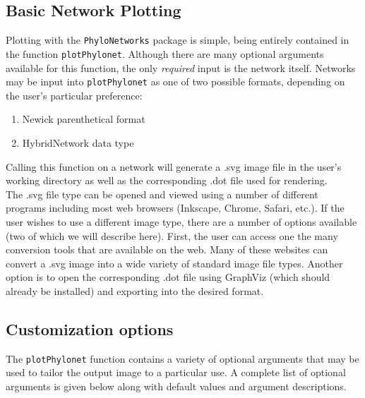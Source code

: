 \documentclass[12pt]{article}
\begin{document}
\subsection{Basic Network Plotting}

Plotting with the \texttt{PhyloNetworks} package is simple, being entirely contained in the function \texttt{plotPhylonet}.
Although there are  many optional arguments available for this function, the only \textit{required} input is the network itself.
Networks may be input into \texttt{plotPhylonet} as one of two possible formats, depending on the user's particular preference:
\begin{enumerate}
\item Newick parenthetical format
\item HybridNetwork data type
\end{enumerate}

\noindent Calling this function on a network will generate a .svg image file in the user's working directory
as well as the corresponding .dot file used for rendering. \\

\noindent The .svg file type can be opened and viewed using a number
of different programs including most web browsers (Inkscape, Chrome, Safari, etc.).
If the user wishes to use a different image type, there are a number of options available (two of which we will describe here).
First, the user can access one the many conversion tools that are available on the web. Many of these websites can convert a .svg image into a wide variety of standard image file types.
Another option is to open the corresponding .dot file using GraphViz (which should already be installed) and exporting into the desired format.

\subsection{Customization options}

The \texttt{plotPhylonet} function contains a variety of optional arguments that may be used to tailor the output image to a particular use.
A complete list of optional arguments is given below along with default values and argument descriptions.
\end{document}
